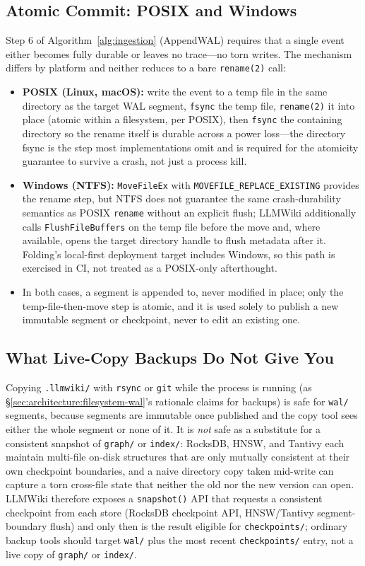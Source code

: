 \subsection{Atomic Commit: POSIX and Windows}
Step 6 of Algorithm~\ref{alg:ingestion} (AppendWAL) requires that a single event either becomes fully durable or leaves no trace---no torn writes. The mechanism differs by platform and neither reduces to a bare \texttt{rename(2)} call:
\begin{itemize}
  \item \textbf{POSIX (Linux, macOS):} write the event to a temp file in the same directory as the target WAL segment, \texttt{fsync} the temp file, \texttt{rename(2)} it into place (atomic within a filesystem, per POSIX), then \texttt{fsync} the containing directory so the rename itself is durable across a power loss---the directory fsync is the step most implementations omit and is required for the atomicity guarantee to survive a crash, not just a process kill.
  \item \textbf{Windows (NTFS):} \texttt{MoveFileEx} with \texttt{MOVEFILE\_REPLACE\_EXISTING} provides the rename step, but NTFS does not guarantee the same crash-durability semantics as POSIX \texttt{rename} without an explicit flush; LLMWiki additionally calls \texttt{FlushFileBuffers} on the temp file before the move and, where available, opens the target directory handle to flush metadata after it. Folding's local-first deployment target includes Windows, so this path is exercised in CI, not treated as a POSIX-only afterthought.
  \item In both cases, a segment is appended to, never modified in place; only the temp-file-then-move step is atomic, and it is used solely to publish a new immutable segment or checkpoint, never to edit an existing one.
\end{itemize}

\subsection{What Live-Copy Backups Do Not Give You}
Copying \texttt{.llmwiki/} with \texttt{rsync} or \texttt{git} while the process is running (as \S\ref{sec:architecture:filesystem-wal}'s rationale claims for backups) is safe for \texttt{wal/} segments, because segments are immutable once published and the copy tool sees either the whole segment or none of it. It is \emph{not} safe as a substitute for a consistent snapshot of \texttt{graph/} or \texttt{index/}: RocksDB, HNSW, and Tantivy each maintain multi-file on-disk structures that are only mutually consistent at their own checkpoint boundaries, and a naive directory copy taken mid-write can capture a torn cross-file state that neither the old nor the new version can open. LLMWiki therefore exposes a \texttt{snapshot()} API that requests a consistent checkpoint from each store (RocksDB checkpoint API, HNSW/Tantivy segment-boundary flush) and only then is the result eligible for \texttt{checkpoints/}; ordinary backup tools should target \texttt{wal/} plus the most recent \texttt{checkpoints/} entry, not a live copy of \texttt{graph/} or \texttt{index/}.

